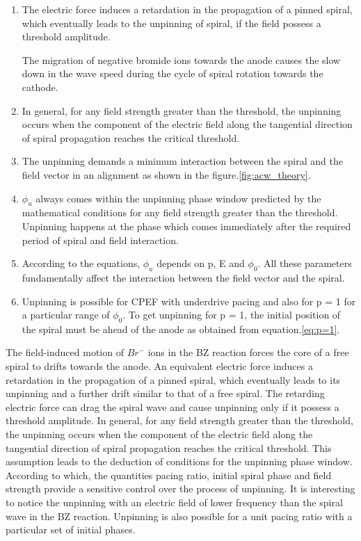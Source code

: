 \documentclass[%
 preprint,
 amsmath,amssymb,
 aps,
]{revtex4-2}
\begin{document}
\begin{enumerate}
    \item The electric force induces a retardation in the propagation of a pinned spiral, which eventually leads to the unpinning of spiral, if the field possess a threshold amplitude. 
    
    The migration of negative bromide ions towards the anode causes the slow down in the wave speed during the cycle of spiral rotation towards the cathode.
    
    \item In general, for any field strength greater than the threshold, the unpinning occurs when the component of the electric field along the tangential direction of spiral propagation reaches the critical threshold.
    
    \item The unpinning demands a minimum interaction between the spiral and the field vector in an alignment as shown in the figure.\ref{fig:acw_theory}.
    
    \item $\phi_u$ always comes within the unpinning phase window predicted by the mathematical conditions for any field strength greater than the threshold.
   Unpinning happens at the phase which comes immediately after the required period of spiral and field interaction.
    
    \item According to the equations, $\phi_u$ depends on p, E and $\phi_0$. All these parameters fundamentally affect the interaction between the field vector and the spiral. 
    
    \item Unpinning is possible for CPEF with underdrive pacing and also for p = 1 for a particular range of $\phi_0$. To get unpinning for p = 1, the initial position of the spiral must be ahead of the anode as obtained from equation.\ref{eq:p=1}.
\end{enumerate}



The field-induced motion of $Br^-$ ions in the BZ reaction forces the core of a free spiral to drifts towards the anode. An equivalent electric force induces a retardation in the propagation of a pinned spiral, which eventually leads to its unpinning and a further drift similar to that of a free spiral. The retarding electric force can drag the spiral wave and cause unpinning only if it possess a threshold amplitude. 
In general, for any field strength greater than the threshold, the unpinning occurs when the component of the electric field along the tangential direction of spiral propagation reaches the critical threshold. This assumption leads to the deduction of conditions for the unpinning phase window.
According to which, the quantities pacing ratio, initial spiral phase and field strength provide a sensitive control over the process of unpinning. It is interesting to notice the unpinning with an electric field of lower frequency than the spiral wave in the BZ reaction. Unpinning is also possible for a unit pacing ratio with a particular set of initial phases. 
\end{document}
